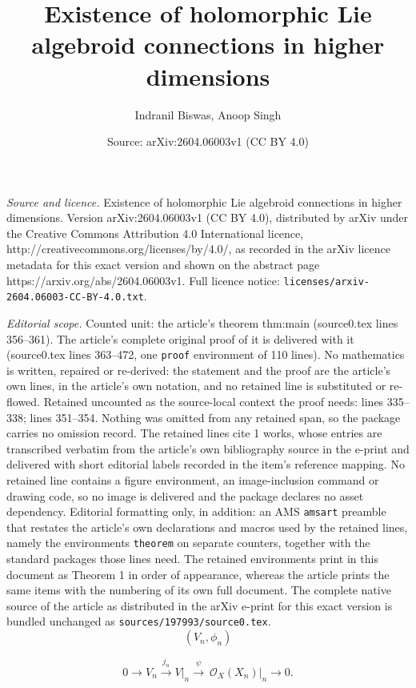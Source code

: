 \documentclass[10pt,a4paper]{amsart}
\title{Existence of holomorphic Lie algebroid connections in higher dimensions}
\author{Indranil Biswas, Anoop Singh}
\date{Source: arXiv:2604.06003v1 (CC BY 4.0)}
\begin{document}
\maketitle

\noindent\emph{Source and licence.} Existence of holomorphic Lie algebroid connections in higher dimensions. Version arXiv:2604.06003v1 (CC BY 4.0), distributed by arXiv under the Creative Commons Attribution 4.0 International licence, http://creativecommons.org/licenses/by/4.0/, as recorded in the arXiv licence metadata for this exact version and shown on the abstract page https://arxiv.org/abs/2604.06003v1. Full licence notice: \texttt{licenses/arxiv-2604.06003-CC-BY-4.0.txt}.\par\smallskip

\noindent\textit{Editorial scope.} Counted unit: the article's theorem thm:main (source0.tex lines 356--361). The article's complete original proof of it is delivered with it (source0.tex lines 363--472, one \texttt{proof} environment of 110 lines). No mathematics is written, repaired or re-derived: the statement and the proof are the article's own lines, in the article's own notation, and no retained line is substituted or re-flowed.  Retained uncounted as the source-local context the proof needs: lines 335--338; lines 351--354.  Nothing was omitted from any retained span, so the package carries no omission record.  The retained lines cite 1 works, whose entries are transcribed verbatim from the article's own bibliography source in the e-print and delivered with short editorial labels recorded in the item's reference mapping.  No retained line contains a figure environment, an image-inclusion command or drawing code, so no image is delivered and the package declares no asset dependency.  Editorial formatting only, in addition: an AMS \texttt{amsart} preamble that restates the article's own declarations and macros used by the retained lines, namely the environments \texttt{theorem} on separate counters, together with the standard packages those lines need.  The retained environments print in this document as Theorem 1 in order of appearance, whereas the article prints the same items with the numbering of its own full document.  The complete native source of the article as distributed in the arXiv e-print for this exact version is bundled unchanged as \texttt{sources/197993/source0.tex}.
\begin{equation}
\label{eq:V_n}
(V_n, \phi_n)
\end{equation}

\begin{equation}\label{eq:s5}
0  \longrightarrow V_n  \xrightarrow{j_n}  V\big\vert_{n} \xrightarrow{\,
\psi\, }\ \mathcal{O}_X(X_n)\big\vert_{n} \longrightarrow  0.
\end{equation}
\end{document}
